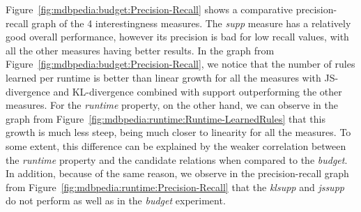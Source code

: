 Figure~\ref{fig:mdbpedia:budget:Precision-Recall} shows a comparative precision-recall graph of the 4
interestingness measures. The \emph{supp} measure has a relatively good overall performance, however its
precision is bad for low recall values, with all the other measures having better results. In the graph from
Figure~\ref{fig:mdbpedia:budget:Precision-Recall}, we notice that the number of rules learned per runtime is better
than linear growth for all the measures with JS-divergence and KL-divergence combined with support outperforming the
other measures.
For the \emph{runtime} property, on the other hand, we can observe in the graph from
Figure~\ref{fig:mdbpedia:runtime:Runtime-LearnedRules} that this growth is much less steep, being much closer to
linearity for all the measures. To some extent, this difference can be explained by the weaker correlation between the
\emph{runtime} property and the candidate relations when compared to the \emph{budget}. In addition, because
of the same reason, we observe in the precision-recall graph from Figure~\ref{fig:mdbpedia:runtime:Precision-Recall}
that the \emph{klsupp} and \emph{jssupp} do not perform as well as in the \emph{budget} experiment.

